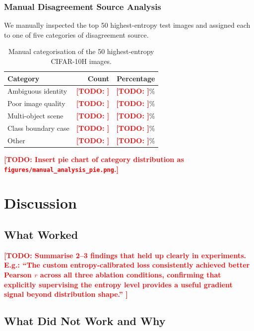 \documentclass[11pt,a4paper]{article}
\newcommand{\todo}[1]{\textcolor{red}{\textbf{[TODO: #1]}}}
\begin{document}
\subsubsection{Manual Disagreement Source Analysis}

We manually inspected the top 50 highest-entropy test images and assigned each
to one of five categories of disagreement source.

\begin{table}[H]
\centering
\caption{Manual categorisation of the 50 highest-entropy CIFAR-10H images.}
\label{tab:manual}
\begin{tabular}{lrr}
\toprule
\textbf{Category} & \textbf{Count} & \textbf{Percentage} \\
\midrule
Ambiguous identity    & \todo{} & \todo{}\% \\
Poor image quality    & \todo{} & \todo{}\% \\
Multi-object scene    & \todo{} & \todo{}\% \\
Class boundary case   & \todo{} & \todo{}\% \\
Other                 & \todo{} & \todo{}\% \\
\bottomrule
\end{tabular}
\end{table}

\todo{Insert pie chart of category distribution as \texttt{figures/manual\_analysis\_pie.png}.}

\section{Discussion}

\subsection{What Worked}

\todo{%
  Summarise 2--3 findings that held up clearly in experiments.
  E.g.: ``The custom entropy-calibrated loss consistently achieved better
  Pearson $r$ across all three ablation conditions, confirming that explicitly
  supervising the entropy level provides a useful gradient signal beyond
  distribution shape.''
}

\subsection{What Did Not Work and Why}
\end{document}
